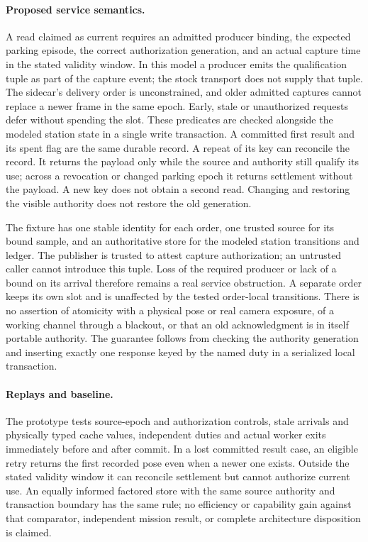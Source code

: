 \documentclass{article}
\begin{document}
\paragraph{Proposed service semantics.}
A read claimed as current requires an admitted producer binding,
the expected parking episode, the correct authorization generation,
and an actual capture time in the stated validity window. In this
model a producer emits the qualification tuple as part of the capture
event; the stock transport does not supply that tuple. The sidecar's
delivery order is unconstrained, and older admitted captures cannot
replace a newer frame in the same epoch. Early, stale or unauthorized
requests defer without spending the slot. These predicates are checked
alongside the modeled station state in a single write transaction. A
committed first result and its spent flag are the same durable record.
A repeat of its key can reconcile the record. It returns the payload
only while the source and authority still qualify its use; across a
revocation or changed parking epoch it returns settlement without the
payload. A new key does not obtain a second read. Changing and restoring
the visible authority does not restore the old generation.

The fixture has one stable identity for each order, one trusted source
for its bound sample, and an authoritative store for the modeled
station transitions and ledger. The publisher is trusted to attest
capture authorization; an untrusted caller cannot introduce this
tuple. Loss of the required producer or lack of a bound on its arrival
therefore remains a real service obstruction. A separate order keeps
its own slot and is unaffected by the tested order-local transitions.
There is no assertion of atomicity with a physical pose or real camera
exposure, of a working channel through a blackout, or that an old
acknowledgment is in itself portable authority. The guarantee follows
from checking the authority generation and inserting exactly one
response keyed by the named duty in a serialized local transaction.

\paragraph{Replays and baseline.}
The prototype tests source-epoch and authorization controls, stale
arrivals and physically typed cache values, independent duties and
actual worker exits immediately before and after commit. In a lost
committed result case, an eligible retry returns the first recorded
pose even when a newer one exists. Outside the stated validity window
it can reconcile settlement but cannot authorize current use. An
equally informed factored store with the same source authority and
transaction boundary has the same rule; no efficiency or capability
gain against that comparator, independent mission result, or complete
architecture disposition is claimed.
\end{document}

